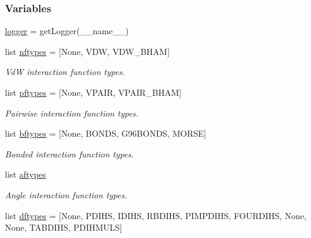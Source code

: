 \subsubsection*{Variables}
\begin{DoxyCompactItemize}
\item 
\hyperlink{namespacesrc_1_1gmxio_af4ece92231f8ad70afc1a559065eec80}{logger} = get\+Logger(\+\_\+\+\_\+name\+\_\+\+\_\+)
\item 
list \hyperlink{namespacesrc_1_1gmxio_aa7357cfd306beaec9404d74d21e5729e}{nftypes} = \mbox{[}None, \textquotesingle{}V\+DW\textquotesingle{}, \textquotesingle{}V\+D\+W\+\_\+\+B\+H\+AM\textquotesingle{}\mbox{]}
\begin{DoxyCompactList}\small\item\em VdW interaction function types. \end{DoxyCompactList}\item 
list \hyperlink{namespacesrc_1_1gmxio_aa2eb9673c40c470f5b83b9a6834bed91}{pftypes} = \mbox{[}None, \textquotesingle{}V\+P\+A\+IR\textquotesingle{}, \textquotesingle{}V\+P\+A\+I\+R\+\_\+\+B\+H\+AM\textquotesingle{}\mbox{]}
\begin{DoxyCompactList}\small\item\em Pairwise interaction function types. \end{DoxyCompactList}\item 
list \hyperlink{namespacesrc_1_1gmxio_a1d9eaea45ad2ce4a5ad671480a896aa8}{bftypes} = \mbox{[}None, \textquotesingle{}B\+O\+N\+DS\textquotesingle{}, \textquotesingle{}G96\+B\+O\+N\+DS\textquotesingle{}, \textquotesingle{}M\+O\+R\+SE\textquotesingle{}\mbox{]}
\begin{DoxyCompactList}\small\item\em Bonded interaction function types. \end{DoxyCompactList}\item 
list \hyperlink{namespacesrc_1_1gmxio_a88d279e65fc0870eb60d9a48b0e82da6}{aftypes}
\begin{DoxyCompactList}\small\item\em Angle interaction function types. \end{DoxyCompactList}\item 
list \hyperlink{namespacesrc_1_1gmxio_a35a8bc876463670e6c8c7342d9653f1f}{dftypes} = \mbox{[}None, \textquotesingle{}P\+D\+I\+HS\textquotesingle{}, \textquotesingle{}I\+D\+I\+HS\textquotesingle{}, \textquotesingle{}R\+B\+D\+I\+HS\textquotesingle{}, \textquotesingle{}P\+I\+M\+P\+D\+I\+HS\textquotesingle{}, \textquotesingle{}F\+O\+U\+R\+D\+I\+HS\textquotesingle{}, None, None, \textquotesingle{}T\+A\+B\+D\+I\+HS\textquotesingle{}, \textquotesingle{}P\+D\+I\+H\+M\+U\+LS\textquotesingle{}\mbox{]}

\end{DoxyCompactItemize}
